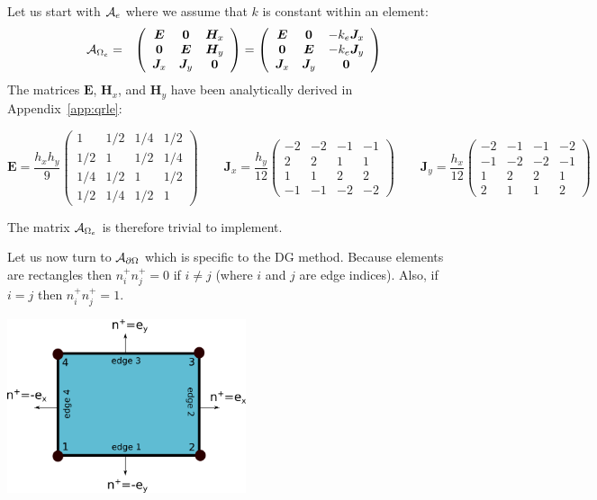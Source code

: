 
Let us start with ${\cal A}_e$ where we assume that $k$ is constant within an element:
\begin{eqnarray}
{\cal A}_{\Omega_e}&=&
\left(
\begin{array}{ccc}
{\bm E} & {\bm 0} & {\bm H}_x \\
{\bm 0} & {\bm E} & {\bm H}_y \\
{\bm J}_x & {\bm J}_y & {\bm 0}
\end{array}
\right)
=
\left(
\begin{array}{ccc}
{\bm E} & {\bm 0} & -k_e{\bm J}_x \\
{\bm 0} & {\bm E} & -k_e{\bm J}_y \\
{\bm J}_x & {\bm J}_y & {\bm 0}
\end{array}
\right)
\end{eqnarray}
The matrices ${\bm E}$, ${\bm H}_x$, and ${\bm H}_y$ 
have been analytically derived in Appendix~\ref{app:qrle}:
\begin{scriptsize}
\[
{\bm E}=
\frac{h_x h_y}{9}
\left(
\begin{array}{cccc}
1 & 1/2 & 1/4 & 1/2 \\ 
1/2 & 1   & 1/2 & 1/4 \\ 
1/4 & 1/2 & 1 & 1/2 \\ 
1/2 & 1/4 & 1/2 & 1  
\end{array}
\right)
\qquad
{\bm J}_x=
\frac{h_y}{12} 
\left(
\begin{array}{cccc}
-2 & -2 & -1 & -1 \\
 2 &  2 &  1 & 1 \\
  1 &   1 & 2 & 2 \\
- 1 &  - 1 & -2 & -2
\end{array}
\right)
\qquad
{\bm J}_y=
\frac{h_x}{12} 
\left(
\begin{array}{cccc}
-2 & -1 & -1 & -2 \\
-1 & -2 & -2 & -1  \\
 1 &  2 &  2 &  1  \\
2 & 1 & 1 & 2 
\end{array}
\right) 
\]
\end{scriptsize}
The matrix ${\cal A}_{\Omega_e}$ is therefore trivial to implement. 

Let us now turn to $ {\cal A}_{\partial\Omega}$ which is specific to the DG method.
Because elements are rectangles then $n_i^+n_j^+=0$ if $i \neq j$ (where $i$ and $j$ 
are edge indices). 
Also, if $i=j$ then $n_i^+n_j^+=1$. 

\begin{center}
\includegraphics[width=7cm]{images/dgfem/dgelts_q1}
\end{center}


